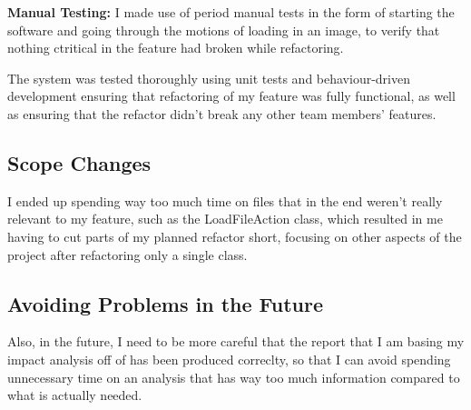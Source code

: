 \textbf{Manual Testing:} I made use of period manual tests in the form of starting the software and going through the motions of loading in an image, to verify that nothing ctritical in the feature had broken while refactoring.

The system was tested thoroughly using unit tests and behaviour-driven development ensuring that refactoring of my feature was fully functional, as well as ensuring that the refactor didn't break any other team members' features.
\subsection{Scope Changes}
I ended up spending way too much time on files that in the end weren't really relevant to my feature, such as the LoadFileAction class, which resulted in me having to cut parts of my planned refactor short, focusing on other aspects of the project after refactoring only a single class.

\subsection{Avoiding Problems in the Future}
Also, in the future, I need to be more careful that the report that I am basing my impact analysis off of has been produced correclty, so that I can avoid spending unnecessary time on an analysis that has way too much information compared to what is actually needed.